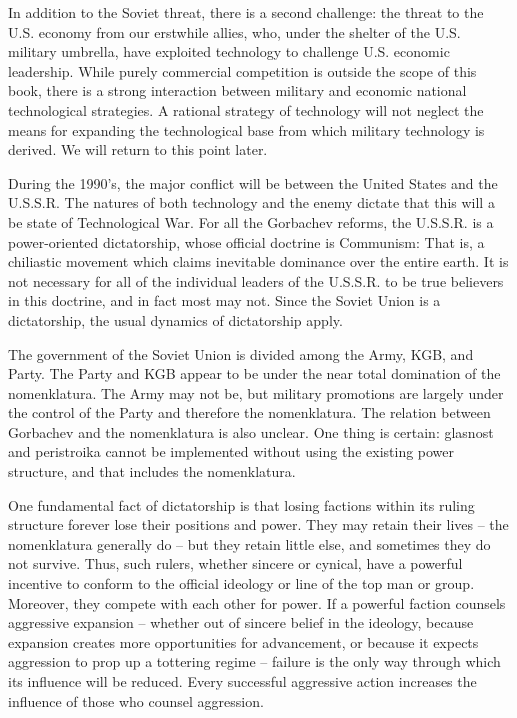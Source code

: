 \documentclass[a4paper,12pt]{book}
\begin{document}
In addition to the Soviet threat, there is a second challenge: the threat to the U.S. economy from our erstwhile allies, who, under the shelter of the U.S. military umbrella, have exploited technology to challenge U.S. economic leadership. While purely commercial competition is outside the scope of this book, there is a strong interaction between military and economic national technological strategies. A rational strategy of technology will not neglect the means for expanding the technological base from which military technology is derived. We will return to this point later.

During the 1990's, the major conflict will be between the United States and the U.S.S.R. The natures of both technology and the enemy dictate that this will a be state of Technological War. For all the Gorbachev reforms, the U.S.S.R. is a power-oriented dictatorship, whose official doctrine is Communism: That is, a chiliastic movement which claims inevitable dominance over the entire earth. It is not necessary for all of the individual leaders of the U.S.S.R. to be true believers in this doctrine, and in fact most may not. Since the Soviet Union is a dictatorship, the usual dynamics of dictatorship apply.

The government of the Soviet Union is divided among the Army, KGB, and Party. The Party and KGB appear to be under the near total domination of the nomenklatura. The Army may not be, but military promotions are largely under the control of the Party and therefore the nomenklatura. The relation between Gorbachev and the nomenklatura is also unclear. One thing is certain: glasnost and peristroika cannot be implemented without using the existing power structure, and that includes the nomenklatura.

One fundamental fact of dictatorship is that losing factions within its ruling structure forever lose their positions and power. They may retain their lives -- the nomenklatura generally do -- but they retain little else, and sometimes they do not survive. Thus, such rulers, whether sincere or cynical, have a powerful incentive to conform to the official ideology or line of the top man or group. Moreover, they compete with each other for power. If a powerful faction counsels aggressive expansion -- whether out of sincere belief in the ideology, because expansion creates more opportunities for advancement, or because it expects aggression to prop up a tottering regime -- failure is the only way through which its influence will be reduced. Every successful aggressive action increases the influence of those who counsel aggression.
\end{document}
